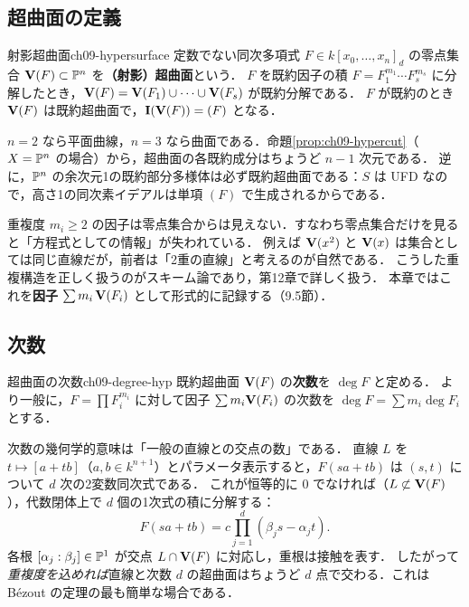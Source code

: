 \subsection{超曲面の定義}

\begin{mydef}{射影超曲面}{ch09-hypersurface}
定数でない同次多項式 $F\in k[x_0,\dots,x_n]_d$ の零点集合 $\mathbf{V}(F)\subset\mathbb{P}^n$ を\textbf{（射影）超曲面}という．
$F$ を既約因子の積 $F=F_1^{m_1}\cdots F_s^{m_s}$ に分解したとき，$\mathbf{V}(F)=\mathbf{V}(F_1)\cup\dots\cup\mathbf{V}(F_s)$ が既約分解である．
$F$ が既約のとき $\mathbf{V}(F)$ は既約超曲面で，$\mathbf{I}(\mathbf{V}(F))=(F)$ となる．
\end{mydef}

$n=2$ なら平面曲線，$n=3$ なら曲面である．命題\ref{prop:ch09-hypercut}（$X=\mathbb{P}^n$ の場合）から，超曲面の各既約成分はちょうど $n-1$ 次元である．
逆に，$\mathbb{P}^n$ の余次元1の既約部分多様体は必ず既約超曲面である：$S$ は UFD なので，高さ1の同次素イデアルは単項 $(F)$ で生成されるからである．

重複度 $m_i\ge2$ の因子は零点集合からは見えない．すなわち零点集合だけを見ると「方程式としての情報」が失われている．
例えば $\mathbf{V}(x^2)$ と $\mathbf{V}(x)$ は集合としては同じ直線だが，前者は「2重の直線」と考えるのが自然である．
こうした重複構造を正しく扱うのがスキーム論であり，第12章で詳しく扱う．
本章ではこれを\textbf{因子} $\sum m_i\,\mathbf{V}(F_i)$ として形式的に記録する（9.5節）．

\subsection{次数}

\begin{mydef}{超曲面の次数}{ch09-degree-hyp}
既約超曲面 $\mathbf{V}(F)$ の\textbf{次数}を $\deg F$ と定める．
より一般に，$F=\prod F_i^{m_i}$ に対して因子 $\sum m_i\mathbf{V}(F_i)$ の次数を $\deg F=\sum m_i\deg F_i$ とする．
\end{mydef}

次数の幾何学的意味は「一般の直線との交点の数」である．
直線 $L$ を $t\mapsto[a+tb]$（$a,b\in k^{n+1}$）とパラメータ表示すると，$F(sa+tb)$ は $(s,t)$ について $d$ 次の2変数同次式である．
これが恒等的に $0$ でなければ（$L\not\subset\mathbf{V}(F)$），代数閉体上で $d$ 個の1次式の積に分解する：
\[
  F(sa+tb)=c\prod_{j=1}^{d}(\beta_j s-\alpha_j t).
\]
各根 $[\alpha_j:\beta_j]\in\mathbb{P}^1$ が交点 $L\cap\mathbf{V}(F)$ に対応し，重根は接触を表す．
したがって\emph{重複度を込めれば}直線と次数 $d$ の超曲面はちょうど $d$ 点で交わる．これは B\'ezout の定理の最も簡単な場合である．

